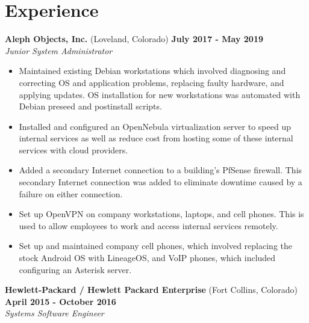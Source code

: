\documentclass[letterpaper,10pt]{article}
\begin{document}
    \section*{Experience}
        \textbf{Aleph Objects, Inc.} (Loveland, Colorado) \hfill \textbf{July 2017 - May 2019} \\[1pt]
        \emph{Junior System Administrator}
        \begin{itemize}
            \item Maintained existing Debian workstations which involved diagnosing and correcting OS and application problems, replacing faulty hardware, and applying updates. OS installation for new workstations was automated with Debian preseed and postinstall scripts.
            \item Installed and configured an OpenNebula virtualization server to speed up internal services as well as reduce cost from hosting some of these internal services with cloud providers.
            \item Added a secondary Internet connection to a building's PfSense firewall. This secondary Internet connection was added to eliminate downtime caused by a failure on either connection.
            \item Set up OpenVPN on company workstations, laptops, and cell phones. This is used to allow employees to work and access internal services remotely.
            \item Set up and maintained company cell phones, which involved replacing the stock Android OS with LineageOS, and VoIP phones, which included configuring an Asterisk server.
        \end{itemize}
        \vspace*{2ex}
        \textbf{Hewlett-Packard / Hewlett Packard Enterprise} (Fort Collins, Colorado) \hfill \textbf{April 2015 - October 2016} \\[1pt]
        \emph{Systems Software Engineer}
\end{document}
